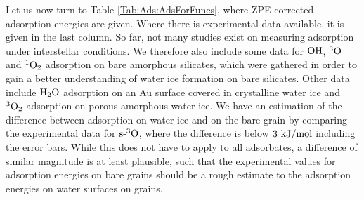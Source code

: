 Let us now turn to Table \ref{Tab:Ads:AdsForFuncs}, where ZPE corrected adsorption
energies are given. Where there is experimental data available, it is given
in the last column. So far, not many studies exist on measuring 
adsorption under interstellar conditions. We therefore also include some data
for $\text O \text H$, ${^3\text{O}}$ and ${^1\text O_2}$ adsorption on bare amorphous silicates, which were gathered in order to
gain a better understanding of water ice formation on bare silicates.
\cite{HeVidali2014,HeJingVidali2014}
Other data include $\text H _2 \text O$ adsorption on an Au surface covered in crystalline water
ice\cite{Fraser2001} and ${^3\text O_2}$ adsorption on porous amorphous water ice.
\cite{He2015}
We have an estimation of the difference between adsorption on water ice and
on the bare grain by comparing the experimental data for $\text{s-}{^3\text{O}}$, where the difference
is below $3~\text {kJ/mol}$ including the error bars. While this does not have to apply to all
adsorbates, a difference of similar magnitude is at least plausible, such that
the experimental values for adsorption energies on bare grains should be a rough estimate
to the adsorption energies on water surfaces on grains.



